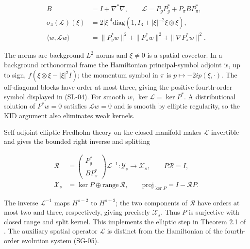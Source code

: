 \begin{equation}\tag{SL-04}\label{eq:SL-04}
\begin{aligned}
B&=I+\nabla^*\nabla,\qquad
\mathscr L=P_gP_g^*+P_\pi BP_\pi^*,\\
\sigma_4(\mathscr L)(\xi)&=2|\xi|^4
\mathrm{diag}\left(1,I_3+|\xi|^{-2}\xi\otimes\xi\right),\\
\langle w,\mathscr Lw\rangle&=\|P_g^*w\|^2+\|P_\pi^*w\|^2
+\|\nabla P_\pi^*w\|^2.
\end{aligned}
\end{equation}

The norms are background $L^2$ norms and $\xi\ne0$ is a spatial covector. In a background orthonormal frame the Hamiltonian principal-symbol adjoint is, up to sign, $f(\xi\otimes\xi-|\xi|^2I)$; the momentum symbol in $\pi$ is $p\mapsto-2ip(\xi,\cdot)$. The off-diagonal blocks have order at most three, giving the positive fourth-order symbol displayed in (SL-04). For smooth $w$, $\ker\mathscr L=\ker P^*$. A distributional solution of $P^*w=0$ satisfies $\mathscr Lw=0$ and is smooth by elliptic regularity, so the KID argument also eliminates weak kernels.

Self-adjoint elliptic Fredholm theory on the closed manifold makes $\mathscr L$ invertible and gives the bounded right inverse and splitting

\begin{equation}\tag{SL-05}\label{eq:SL-05}
\begin{aligned}
\mathscr R&=\begin{pmatrix}P_g^*\\BP_\pi^*\end{pmatrix}
\mathscr L^{-1}:\mathcal Y_s\longrightarrow\mathcal X_s,
\qquad P\mathscr R=I,\\
\mathcal X_s&=\ker P\oplus\mathrm{range}\,\mathscr R,\qquad
\mathrm{proj}_{\ker P}=I-\mathscr RP.
\end{aligned}
\end{equation}

The inverse $\mathscr L^{-1}$ maps $H^{s-2}$ to $H^{s+2}$; the two components of $\mathscr R$ have orders at most two and three, respectively, giving precisely $\mathcal X_s$. Thus $P$ is surjective with closed range and split kernel. This implements the elliptic step in Theorem 2.1 of \cite{FischerMarsdenMoncrief1980}. The auxiliary spatial operator $\mathscr L$ is distinct from the Hamiltonian of the fourth-order evolution system (SG-05).

